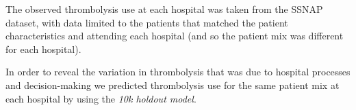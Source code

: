 The observed thrombolysis use at each hospital was taken from the SSNAP dataset, with data limited to the patients that matched the patient characteristics and attending each hospital (and so the patient mix was different for each hospital).

In order to reveal the variation in thrombolysis that was due to hospital processes and decision-making we predicted thrombolysis use for the same patient mix at each hospital by using the \emph{10k holdout model}.






\iffalse
\subsection{How individual hospitals may modify general patterns of thrombolysis}

The SHAP main effect of a feature captures the general pattern of thrombolysis use (in relation to the feature value), then each SHAP interaction effect with another feature may either strengthen or attenuate that main effect. We assessed a features main effect in isolation, and also in combination with the interaction effect with an individual hospital, to understand how individual hospitals respond to feature values differently in terms of their clinical decision to use thrombolysis. We used values from the \emph{all data model}.
\fi

